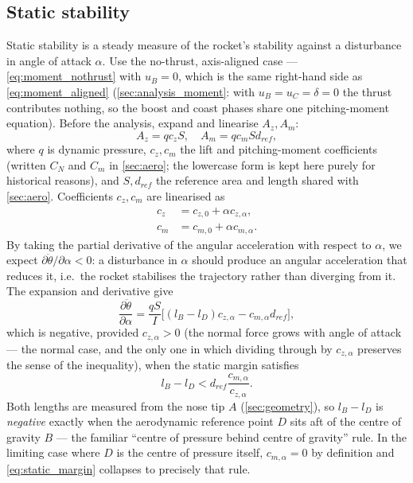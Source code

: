 \subsection{Static stability}\label{sec:analysis_stability}
Static stability is a steady measure of the rocket's stability against a disturbance in angle of
attack $\alpha$. Use the no-thrust, axis-aligned case --- \autoref{eq:moment_nothrust} with
$u_B=0$, which is the same right-hand side as \autoref{eq:moment_aligned}
(\autoref{sec:analysis_moment}: with $u_B=u_C=\delta=0$ the thrust contributes nothing, so the
boost and coast phases share one pitching-moment equation). Before the analysis, expand and
linearise $A_z,A_m$:
\begin{equation} \label{eq:aero_linearised}
    A_z = qc_zS,\quad A_m = qc_mSd_{ref},
\end{equation}
where $q$ is dynamic pressure, $c_z,c_m$ the lift and pitching-moment coefficients (written $C_N$
and $C_m$ in \autoref{sec:aero}; the lowercase form is kept here purely for historical reasons),
and $S,d_{ref}$ the reference area and length shared with \autoref{sec:aero}. Coefficients $c_z,
c_m$ are linearised as
\begin{align}
    c_z &= c_{z,0} + \alpha c_{z,\alpha}, \\
    c_m &= c_{m,0} + \alpha c_{m,\alpha}.
\end{align}
By taking the partial derivative of the angular acceleration with respect to $\alpha$, we expect
$\partial\ddot\theta/\partial\alpha<0$: a disturbance in $\alpha$ should produce an angular
acceleration that reduces it, i.e.\ the rocket stabilises the trajectory rather than diverging
from it. The expansion and derivative give
\begin{equation} \label{eq:dtheta_dalpha}
    \frac{\partial \ddot\theta}{\partial \alpha} = \frac{qS}{I}\biggl[(l_B - l_D)c_{z,\alpha} - c_{m,\alpha}d_{ref}\biggr],
\end{equation}
which is negative, provided $c_{z,\alpha}>0$ (the normal force grows with angle of attack --- the
normal case, and the only one in which dividing through by $c_{z,\alpha}$ preserves the sense of
the inequality), when the static margin satisfies
\begin{equation} \label{eq:static_margin}
    l_B - l_D < d_{ref}\frac{c_{m,\alpha}}{c_{z,\alpha}}.
\end{equation}
Both lengths are measured from the nose tip $A$ (\autoref{sec:geometry}), so $l_B-l_D$ is
\emph{negative} exactly when the aerodynamic reference point $D$ sits aft of the centre of gravity
$B$ --- the familiar ``centre of pressure behind centre of gravity'' rule. In the limiting case
where $D$ is the centre of pressure itself, $c_{m,\alpha}=0$ by definition and
\autoref{eq:static_margin} collapses to precisely that rule.

